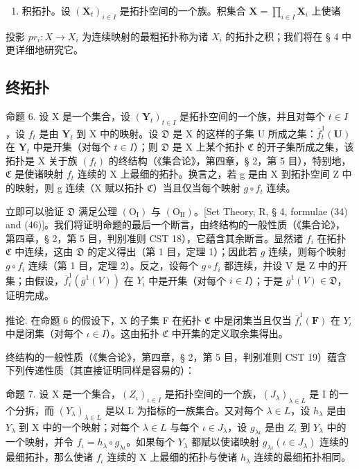 \begin{enumerate}
\def\labelenumi{\arabic{enumi})}
\setcounter{enumi}{2}
\tightlist
\item
  积拓扑。设 \((\mathbf{X}_t)_{i \in I}\) 是拓扑空间的一个族。积集合 \(\mathbf{X} = \prod_{i \in I} \mathbf{X}_i\) 上使诸
\end{enumerate}

投影 \(pr_{i}: X \rightarrow X_{i}\) 为连续映射的最粗拓扑称为诸 \(X_{i}\) 的拓扑之积；我们将在 § 4 中更详细地研究它。

\subsection{终拓扑}

命题 6. 设 X 是一个集合，设 \((\mathbf{Y}_t)_{t \in I}\) 是拓扑空间的一个族，并且对每个 \(t \in I\)，设 \(f_t\) 是由 \(\mathbf{Y}_t\) 到 X 中的映射。设 \(\mathfrak{D}\) 是 X 的这样的子集 U 所成之集：\(\overline{f}_t^1(\mathbf{U})\) 在 \(\mathbf{Y}_t\) 中是开集（对每个 \(t \in I\)）；则 \(\mathfrak{D}\) 是 X 上某个拓扑 \(\mathfrak{C}\) 的开子集所成之集，该拓扑是 X 关于族 \((f_t)\) 的终结构（《集合论》，第四章，§ 2，第 5 目），特别地，\(\mathfrak{C}\) 是使诸映射 \(f_t\) 连续的 X 上最细的拓扑。换言之，若 g 是由 X 到拓扑空间 Z 中的映射，则 g 连续（X 赋以拓扑 \(\mathfrak{C}\)）当且仅当每个映射 \(g \circ f_t\) 连续。

立即可以验证 \(\mathfrak{D}\) 满足公理 \((\mathrm{O_I})\) 与 \((\mathrm{O_{II}})\)。{[}Set Theory, R, § 4, formulae (34) and (46){]}。我们将证明命题的最后一个断言，由终结构的一般性质（《集合论》，第四章，§ 2，第 5 目，判别准则 CST 18），它蕴含其余断言。显然诸 \(f_{i}\) 在拓扑 \(\mathfrak{C}\) 中连续，这由 \(\mathfrak{D}\) 的定义得出（第 1 目，定理 1）；因此若 \(g\) 连续，则每个映射 \(g \circ f_{i}\) 连续（第 1 目，定理 2）。反之，设每个 \(g \circ f_{i}\) 都连续，并设 V 是 Z 中的开集；由假设，\(\overline{f}_{i}^{1}(\overline{g}^{1}(V))\) 在 \(Y_{i}\) 中是开集（对每个 \(i \in I\)）；于是 \(\overline{g}^{1}(V) \in \mathfrak{D}\)，证明完成。

推论. 在命题 6 的假设下，X 的子集 F 在拓扑 \(\mathfrak{C}\) 中是闭集当且仅当 \(\overline{f}_{\iota}^{1}(\mathbf{F})\) 在 \(Y_{\iota}\) 中是闭集（对每个 \(\iota \in I\)）。这由拓扑 \(\mathfrak{C}\) 中开集的定义取余集得出。

终结构的一般性质（《集合论》，第四章，§ 2，第 5 目，判别准则 CST 19）蕴含下列传递性质（其直接证明同样是容易的）：

命题 7. 设 X 是一个集合，\((Z_{\iota})_{\iota \in I}\) 是拓扑空间的一个族，\((J_{\lambda})_{\lambda \in L}\) 是 I 的一个分拆，而 \((Y_{\lambda})_{\lambda \in L}\) 是以 L 为指标的一族集合。又对每个 \(\lambda \in L\)，设 \(h_{\lambda}\) 是由 \(Y_{\lambda}\) 到 X 中的一个映射；对每个 \(\lambda \in L\) 与每个 \(\iota \in J_{\lambda}\)，设 \(g_{\lambda \iota}\) 是由 \(Z_{\iota}\) 到 \(Y_{\lambda}\) 中的一个映射，并令 \(f_{\iota} = h_{\lambda} \circ g_{\lambda \iota}\)。如果每个 \(Y_{\lambda}\) 都赋以使诸映射 \(g_{\lambda \iota} (\iota \in J_{\lambda})\) 连续的最细拓扑，那么使诸 \(f_{\iota}\) 连续的 X 上最细的拓扑与使诸 \(h_{\lambda}\) 连续的最细拓扑相同。

